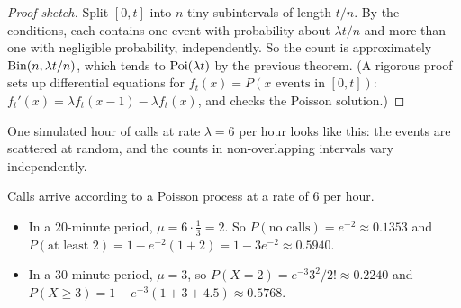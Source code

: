 \begin{proof}[Proof sketch]
Split $[0,t]$ into $n$ tiny subintervals of length $t/n$. By the conditions, each contains
one event with probability about $\lambda t/n$ and more than one with negligible
probability, independently. So the count is approximately $\operatorname{Bin}(n, \lambda t/n)$, which
tends to $\operatorname{Poi}(\lambda t)$ by the previous theorem. (A rigorous proof sets up differential
equations for $f_t(x) = P(x \text{ events in } [0,t])$:
$f_t'(x) = \lambda f_t(x-1) - \lambda f_t(x)$, and checks the Poisson solution.)
\end{proof}

One simulated hour of calls at rate $\lambda = 6$ per hour looks like this: the events
are scattered at random, and the counts in non-overlapping intervals vary independently.

\begin{center}
\end{center}

\begin{example}
Calls arrive according to a Poisson process at a rate of $6$ per hour.
\begin{itemize}
  \item In a $20$-minute period, $\mu = 6\cdot\frac13 = 2$. So
        $P(\text{no calls}) = e^{-2} \approx 0.1353$ and
        $P(\text{at least 2}) = 1 - e^{-2}(1 + 2) = 1 - 3e^{-2} \approx 0.5940$.
  \item In a $30$-minute period, $\mu = 3$, so $P(X = 2) = e^{-3}3^2/2! \approx 0.2240$
        and $P(X \ge 3) = 1 - e^{-3}(1 + 3 + 4.5) \approx 0.5768$.
\end{itemize}
\end{example}

